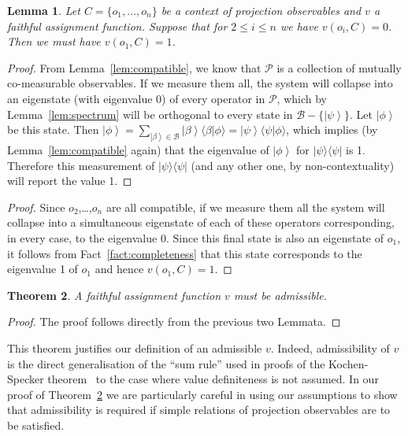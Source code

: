 \documentclass[%
 preprint,
 showpacs,
 showkeys,
 amsmath,
 amssymb,
 aps,
 pra,
 ]{revtex4-1}
\newtheorem{Theorem}{Theorem}
\newtheorem{Lemma}[Theorem]{Lemma}
\theoremstyle{definition}
\newcommand{\ket}[1]{\left| #1 \right>}
\newcommand{\iprod}[2]{\langle #1 | #2 \rangle}
\newcommand{\oprod}[2]{| #1 \rangle\langle #2 |}
\begin{document}
\begin{Lemma}
\label{lem:no to yes}
Let $C=\{o_1,\dots,o_n\}$ be a context of projection observables and $v$ a faithful assignment function.
 Suppose that for $2\le i \le n$ we have $v(o_i,C)=0$. Then we must have $v(o_1,C)=1$.
\end{Lemma}
\begin{proof}
From Lemma~\ref{lem:compatible}, we know that $\mathcal{P}$ is a collection of mutually co-measurable observables.
If we measure them all, the system will collapse into an eigenstate (with eigenvalue 0) of every operator in $\mathcal{P}$, which by Lemma~\ref{lem:spectrum} will be orthogonal to every state in $\mathcal{B} - \{\ket{\psi}\}$.
Let $\ket{\phi}$ be this state.
Then $\ket{\phi} = \sum_{\ket{\beta} \in \mathcal{B}} \ket{\beta} \iprod{\beta}{\phi} = \ket{\psi} \iprod{\psi}{\phi}$, which implies (by Lemma~\ref{lem:compatible} again) that the eigenvalue of $\ket{\phi}$ for $\oprod{\psi}{\psi}$ is 1.
Therefore this measurement of $\oprod{\psi}{\psi}$ (and any other one, by non-contextuality) will report the value 1.
\end{proof}
\fi
\begin{proof}
Since $o_2$,\dots,$o_n$ are all compatible, if we measure them all the system will collapse into a simultaneous eigenstate of each of these operators corresponding, in every case, to the eigenvalue 0. Since this final state is also an eigenstate of $o_1$, it follows from Fact~\ref{fact:completeness} that this state corresponds to the eigenvalue 1 of $o_1$ and hence $v(o_1,C)=1$.
\end{proof}

\begin{Theorem}
	\label{thm:admissible}
	A faithful assignment function $v$ must be admissible.
\end{Theorem}
\begin{proof}
	The proof follows directly from the previous two Lemmata.
\end{proof}
This theorem justifies our definition of an admissible $v$.
Indeed, admissibility of $v$ is the direct generalisation of the ``sum rule'' used in proofs of the Kochen-Specker theorem~\cite{kochen1,Peres:1996fk} to the case where value definiteness is not assumed.
In our proof of Theorem~\ref{thm:admissible} we are particularly careful in using our assumptions to show that admissibility is required if simple relations of projection observables are to be satisfied.\\
\end{document}
